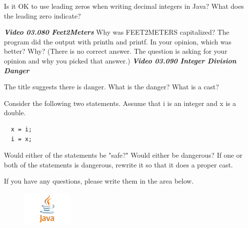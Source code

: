 \documentclass[letterpaper,11pt]{exam}
\newcommand{\videoheading}[1]{\Large\textbf{\textit{#1}}}
\begin{document}
\begin{questions}
\question Is it OK to use leading zeros when writing decimal integers in Java?  What does the leading zero indicate?

\videoheading{Video 03.080 Feet2Meters}
\question Why was FEET2METERS capitalized?
\question The program did the output with println and printf.  In your opinion, which was better?  Why? (There is no correct answer.  The question is asking for your opinion and why you picked that answer.)
\vspace{1.2cm}
\videoheading{Video 03.090 Integer Division Danger}

\question The title suggests there is danger.  What is the danger?
\vspace{1.5cm}
\question What is a cast?
\begin{samepage}
Consider the following two statements. Assume that i is an integer and x is a double.
\begin{verbatim}
  x = i;
  i = x;
\end{verbatim}
Would either of the statements be "safe?"  Would either be dangerous?  If one or both of the statements is dangerous, rewrite it so that it does a proper cast.
\end{samepage}
\end{questions}
\vspace{2.0cm}
If you have any questions, please write them in the area below.
\begin{figure}[b]\label{end}
	\center
	\includegraphics[width=1in]{java}
\end{figure}
\end{document}
